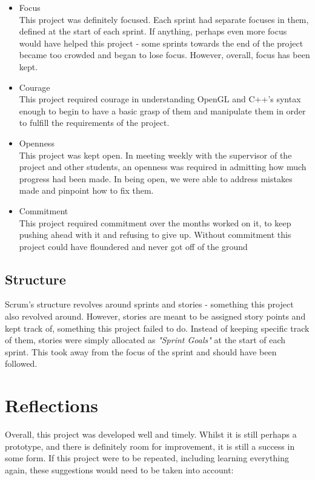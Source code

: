 \documentclass[a4paper,10pt]{report}
\begin{document}
\begin{itemize}
    \item Focus\\
    This project was definitely focused. Each sprint had separate focuses in them, defined at the start of each sprint. If anything, perhaps even more focus would have helped this project - some sprints towards the end of the project became too crowded and began to lose focus. However, overall, focus has been kept.
    \item Courage\\
    This project required courage in understanding OpenGL and C++'s syntax enough to begin to have a basic grasp of them and manipulate them in order to fulfill the requirements of the project. 
    \item Openness\\
    This project was kept open. In meeting weekly with the supervisor of the project and other students, an openness was required in admitting how much progress had been made. In being open, we were able to address mistakes made and pinpoint how to fix them. 
    \item Commitment\\
    This project required commitment over the months worked on it, to keep pushing ahead with it and refusing to give up. Without commitment this project could have floundered and never got off of the ground
\end{itemize}

\subsection{Structure}
Scrum's structure revolves around sprints and stories - something this project also revolved around. However, stories are meant to be assigned story points and kept track of, something this project failed to do. Instead of keeping specific track of them, stories were simply allocated as \textit{"Sprint Goals"} at the start of each sprint. This took away from the focus of the sprint and should have been followed.

\section{Reflections}
Overall, this project was developed well and timely. Whilst it is still perhaps a prototype, and there is definitely room for improvement, it is still a success in some form. If this project were to be repeated, including learning everything again, these suggestions would need to be taken into account:
\end{document}

